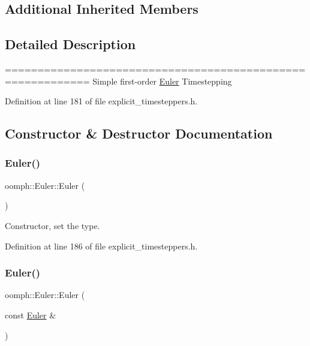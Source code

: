 \subsection*{Additional Inherited Members}


\subsection{Detailed Description}
=========================================================== Simple first-\/order \hyperlink{classoomph_1_1Euler}{Euler} Timestepping 

Definition at line 181 of file explicit\+\_\+timesteppers.\+h.



\subsection{Constructor \& Destructor Documentation}
\mbox{\label{classoomph_1_1Euler_a6d7ce4a89e4464afee180b7e7a69bc30}} 
\subsubsection{\texorpdfstring{Euler()}{Euler()}\hspace{0.1cm}{\footnotesize\ttfamily [1/2]}}
{\footnotesize\ttfamily oomph\+::\+Euler\+::\+Euler (\begin{DoxyParamCaption}{ }\end{DoxyParamCaption})\hspace{0.3cm}{\ttfamily [inline]}}



Constructor, set the type. 



Definition at line 186 of file explicit\+\_\+timesteppers.\+h.

\mbox{\label{classoomph_1_1Euler_a45d5fafc7d7cc41750205c4a7690e093}} 
\subsubsection{\texorpdfstring{Euler()}{Euler()}\hspace{0.1cm}{\footnotesize\ttfamily [2/2]}}
{\footnotesize\ttfamily oomph\+::\+Euler\+::\+Euler (\begin{DoxyParamCaption}\item[{const \hyperlink{classoomph_1_1Euler}{Euler} \&}]{ }\end{DoxyParamCaption})\hspace{0.3cm}{\ttfamily [inline]}}




